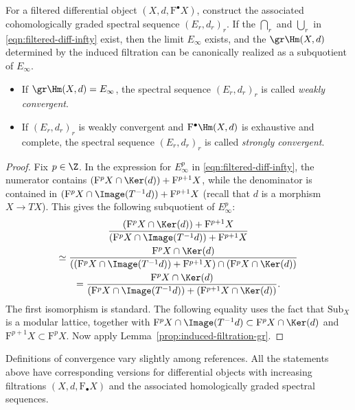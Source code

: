 \begin{definition-proposition}\label{def:diff-obj-convergence}
	For a filtered differential object $(X,d,\mathrm{F}^\bullet X)$, construct
	the associated cohomologically graded spectral sequence $(E_r,d_r)_r$. If
	the $\bigcap_r$ and $\bigcup_r$ in \eqref{eqn:filtered-diff-infty} exist,
	then the limit $E_\infty$ exists, and the $\gr\Hm(X,d)$ determined by the
	induced filtration can be canonically realized as a subquotient of
	$E_\infty$.
	\begin{itemize}
		\item If $\gr\Hm(X,d)=E_\infty$, the spectral sequence
		$(E_r,d_r)_r$ is called \emph{weakly convergent}.
		\item If $(E_r,d_r)_r$ is weakly convergent and
		$\mathrm{F}^\bullet\Hm(X,d)$ is exhaustive and complete, the spectral
		sequence $(E_r,d_r)_r$ is called \emph{strongly convergent}.
	\end{itemize}
\end{definition-proposition}
\begin{proof}
	Fix $p\in\Z$. In the expression for $E_\infty^p$ in
	\eqref{eqn:filtered-diff-infty}, the numerator contains
	$(\mathrm{F}^pX\cap\Ker(d))+\mathrm{F}^{p+1}X$, while the denominator is
	contained in
	$(\mathrm{F}^pX\cap\Image(T^{-1}d))+\mathrm{F}^{p+1}X$
	(recall that $d$ is a morphism $X\to TX$). This gives the following
	subquotient of $E_\infty^p$:
	\begin{multline*}
		\dfrac{(\mathrm{F}^pX\cap\Ker(d))+\mathrm{F}^{p+1}X}
		{(\mathrm{F}^pX\cap\Image(T^{-1}d))+\mathrm{F}^{p+1}X} \\
		\simeq\dfrac{\mathrm{F}^pX\cap\Ker(d)}
		{((\mathrm{F}^pX\cap\Image(T^{-1}d))+\mathrm{F}^{p+1}X)
		 \cap(\mathrm{F}^pX\cap\Ker(d))} \\
		=\dfrac{\mathrm{F}^pX\cap\Ker(d)}
		{(\mathrm{F}^pX\cap\Image(T^{-1}d))
		 +(\mathrm{F}^{p+1}X\cap\Ker(d))}.
	\end{multline*}
	The first isomorphism is standard. The following equality uses the fact that
	$\mathrm{Sub}_X$ is a modular lattice, together with
	$\mathrm{F}^pX\cap\Image(T^{-1}d)
	\subset\mathrm{F}^pX\cap\Ker(d)$ and
	$\mathrm{F}^{p+1}X\subset\mathrm{F}^pX$. Now apply
	Lemma~\ref{prop:induced-filtration-gr}.
\end{proof}

Definitions of convergence vary slightly among references. All the statements
above have corresponding versions for differential objects with increasing
filtrations $(X,d,\mathrm{F}_\bullet X)$ and the associated homologically
graded spectral sequences.
